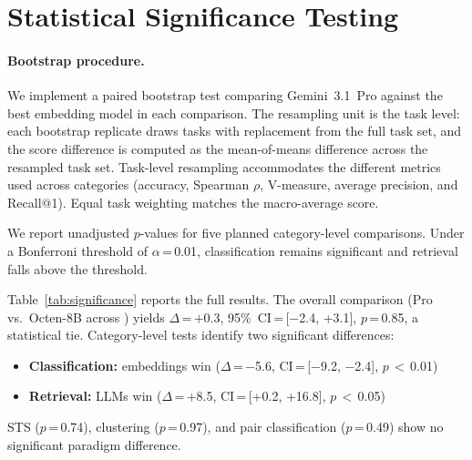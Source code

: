 

\section{Statistical Significance Testing}
\label{app:significance}

\paragraph{Bootstrap procedure.}
We implement a paired bootstrap test \citep{efron1979bootstrap} comparing Gemini~3.1~Pro against the best embedding model in each comparison.
The resampling unit is the task level: each bootstrap replicate draws \mteblm{} tasks with replacement from the full \mteblm{} task set, and the score difference is computed as the mean-of-means difference across the resampled task set.
Task-level resampling accommodates the different metrics used across categories (accuracy, Spearman $\rho$, V-measure, average precision, and Recall@1). Equal task weighting matches the macro-average score.

We report unadjusted $p$-values for five planned category-level comparisons. Under a Bonferroni threshold of $\alpha$\,=\,0.01, classification remains significant and retrieval falls above the threshold.

Table~\ref{tab:significance} reports the full results.
The overall comparison (Pro vs.\ Octen-8B across \mteblm) yields $\Delta$\,=\,$+$0.3, 95\%~CI\,=\,[$-$2.4, +3.1], $p$\,=\,0.85, a statistical tie.
Category-level tests identify two significant differences:
\begin{itemize}
    \item \textbf{Classification:} embeddings win ($\Delta$\,=\,$-$5.6, CI\,=\,[$-$9.2, $-$2.4], $p$\,$<$\,0.01)
    \item \textbf{Retrieval:} LLMs win ($\Delta$\,=\,+8.5, CI\,=\,[+0.2, +16.8], $p$\,$<$\,0.05)
\end{itemize}
STS ($p$\,=\,0.74), clustering ($p$\,=\,0.97), and pair classification ($p$\,=\,0.49) show no significant paradigm difference.

